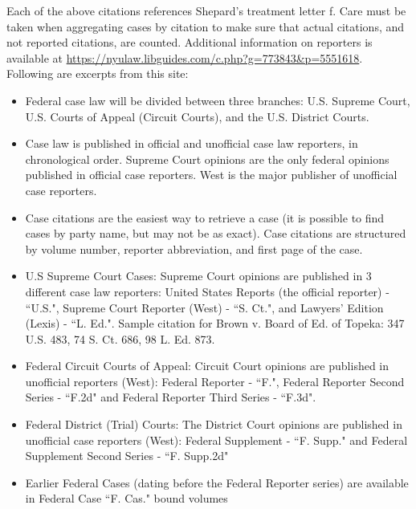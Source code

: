 \documentclass[10pt, letterpaper]{article}
\begin{document}
\begin{spacing}{1.0}
Each of the above citations references Shepard's treatment letter f.  Care must be taken when aggregating cases by citation to make sure that actual citations, and not reported citations, are counted.  Additional information on reporters is available at \url{https://nyulaw.libguides.com/c.php?g=773843\&p=5551618}.  Following are excerpts from this site:

\begin{itemize}\setlength\itemsep{1pt}
  \item Federal case law will be divided between three branches: U.S. Supreme Court, U.S. Courts of Appeal (Circuit Courts), and the U.S. District Courts. 
  \item  Case law is published in official and unofficial case law reporters, in chronological order. Supreme Court opinions are the only federal opinions published in official case reporters.  West is the major publisher of unofficial case reporters.
  \item Case citations are the easiest way to retrieve a case (it is possible to find cases by party name, but may not be  as exact).  Case citations are structured by volume number, reporter abbreviation, and first page of the case. 
  \item U.S Supreme Court Cases: Supreme Court opinions are published in 3 different case law reporters:
  United States Reports (the official reporter) - ``U.S.", Supreme Court Reporter (West) - ``S. Ct.",
  and Lawyers' Edition (Lexis) - ``L. Ed.".  Sample citation for Brown v. Board of Ed. of Topeka:
  347 U.S. 483, 74 S. Ct. 686, 98 L. Ed. 873.
  \item  Federal Circuit Courts of Appeal: Circuit Court opinions are published in unofficial reporters (West):
  Federal Reporter - ``F.", Federal Reporter Second Series - ``F.2d" and Federal Reporter Third Series - ``F.3d".
  \item Federal District (Trial) Courts:  The District Court opinions are published in unofficial case reporters (West):
  Federal Supplement - ``F. Supp." and Federal Supplement Second Series - ``F. Supp.2d"
  \item Earlier Federal Cases (dating before the Federal Reporter series) are available in Federal Case ``F. Cas." bound
  volumes
\end{itemize}


\clearpage


\end{spacing}
\end{document}
